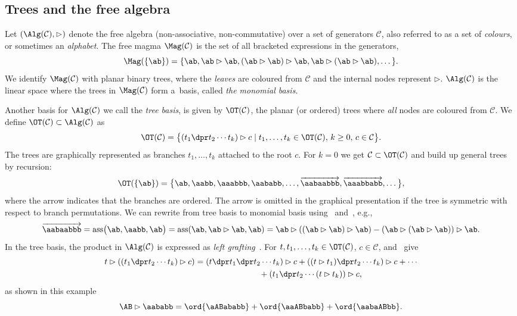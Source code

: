 \documentclass[pdftex]{sigma}
\numberwithin{equation}{section}
\begin{document}
\subsection{Trees and the free algebra}\label{sec:Trees}

Let $(\Alg(\mathcal{C}),\rhd)$ denote the free algebra (non-associative, non-commutative) over a set of generators $\mathcal{C}$,
also referred to as a set of \emph{colours}, or sometimes an \emph{alphabet}.
The free magma $\Mag(\mathcal{C})$ is the set of all bracketed expressions in the generators,
\[\Mag(\{\ab\}) = \{\ab,\ab\rhd\ab, (\ab\rhd\ab)\rhd \ab, \ab\rhd(\ab\rhd \ab),\dots \} . \]
We identify $\Mag(\mathcal{C})$ with planar binary trees, where the \emph{leaves} are coloured from $\mathcal{C}$ and the internal nodes represent $\rhd$.
$\Alg(\mathcal{C})$ is the linear space where the trees in $\Mag(\mathcal{C})$ form a~basis, called \emph{the monomial basis}.

Another basis for $\Alg(\mathcal{C})$ we call the \emph{tree basis}, is given by $\OT(\mathcal{C})$, the planar (or ordered) trees where \emph{all} nodes are coloured from $\mathcal{C}$. We define $\OT(\mathcal{C})\subset\Alg(\mathcal{C})$ as
\[\OT(\mathcal{C}) = \bigl\{({t_1\dpr t_2\cdots t_k}) \rhd c \mid t_1,\dots,t_k\in \OT(\mathcal{C}),\, k\geq 0,\, c\in \mathcal{C}\bigr\} .\]
The trees are graphically represented as branches $t_1,\dots,t_k$ attached to the root $c$. For $k=0$ we get $\mathcal{C} \subset \OT(\mathcal{C})$ and build up general trees by recursion:
\[\OT(\{\ab\}) = \bigl\{\ab,\aabb,\aaabbb,\aababb,\dots,\overrightarrow{\aabaabbb}, \overrightarrow{\aaabbabb},\dots\bigr\} ,\]
where the arrow indicates that the branches are ordered. The arrow is omitted in the graphical presentation if the tree is symmetric with respect to branch permutations.
We can rewrite from tree basis to monomial basis using~ and~, e.g.,
\[\overrightarrow{\aabaabbb} = \text{ass}\bigl(\ab,\aabb,\ab\bigr) = \text{ass}(\ab,\ab\rhd\ab,\ab) = \ab\rhd((\ab\rhd\ab)\rhd\ab)-(\ab\rhd(\ab\rhd\ab))\rhd\ab .\]
In the tree basis, the product in $\Alg(\mathcal{C})$ is expressed as \emph{left grafting}~\cite{Al-Kaabi_14, MK_Wright_08}. For $t,t_1,\dots,t_k\in \OT(\mathcal{C})$, $c\in \mathcal{C}$,  and~ give
\begin{gather*}
 t\rhd(({t_1\dpr t_2\cdots t_k})\rhd c) = {(t\dpr t_1\dpr t_2\cdots t_k})\rhd c + {((t\rhd t_1)\dpr t_2\cdots t_k})\rhd c
+\cdots \\ \hphantom{ t\rhd(({t_1\dpr t_2\cdots t_k})\rhd c) =}{}
+({t_1\dpr t_2\cdots (t\rhd t_k)})\rhd c,
\end{gather*}
as shown in this example
\[\AB\rhd \aababb = \ord{\aABababb}+ \ord{\aaABbabb} + \ord{\aabaABbb} .\]
\end{document}
